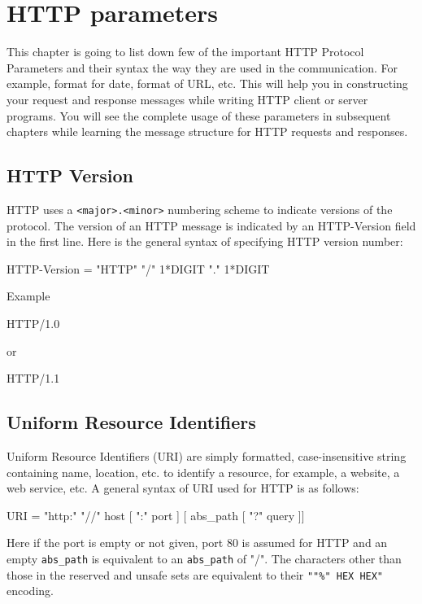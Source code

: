 \documentclass[a4paper,11pt,bahasa]{extarticle}
\begin{document}
\section{HTTP parameters}

This chapter is going to list down few of the important HTTP Protocol Parameters
and their syntax the way they are used in the communication. For example, format
for date, format of URL, etc. This will help you in constructing your request and
response messages while writing HTTP client or server programs. You will see the
complete usage of these parameters in subsequent chapters while learning the message
structure for HTTP requests and responses.

\subsection{HTTP Version}

HTTP uses a \verb|<major>.<minor>| numbering scheme to indicate versions of the protocol.
The version of an HTTP message is indicated by an HTTP-Version field in the first line.
Here is the general syntax of specifying HTTP version number:
\begin{textcode}
HTTP-Version   = "HTTP" "/" 1*DIGIT "." 1*DIGIT
\end{textcode}
Example
\begin{textcode}
HTTP/1.0
\end{textcode}
or
\begin{textcode}
HTTP/1.1
\end{textcode}

\subsection{Uniform Resource Identifiers}

Uniform Resource Identifiers (URI) are simply formatted, case-insensitive string containing name, 
location, etc. to identify a resource, for example, a website, a web service, etc. A general syntax of 
URI used for HTTP is as follows:

\begin{textcode}
URI = "http:" "//" host [ ":" port ] [ abs_path [ "?" query ]]
\end{textcode}

Here if the port is empty or not given, port 80 is assumed for HTTP and an empty
\verb|abs_path| is equivalent 
to an \verb|abs_path| of "/".
The characters other than those in the reserved and unsafe sets are equivalent to 
their \verb|""%" HEX HEX"| encoding.
\end{document}
